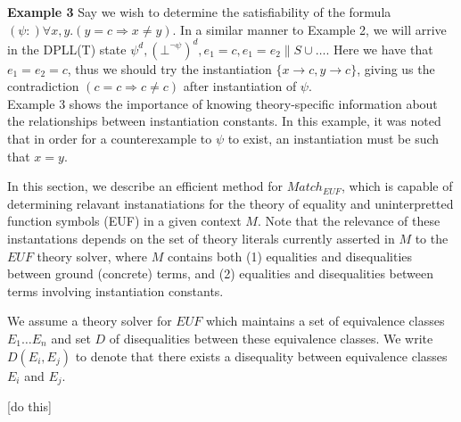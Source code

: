 \documentclass{llncs}
\begin{document}
{\bf Example 3} 
Say we wish to determine the satisfiability of the formula $(\psi :) \forall x, y. ( y = c \Rightarrow x \neq y )$.
In a similar manner to Example 2, we will arrive in the DPLL(T) state $\psi^d, (\bot^{ \neg \psi })^d, e_1 = c, e_1 = e_2 \parallel S \cup \ldots$.
Here we have that $e_1 = e_2 = c$, thus we should try the instantiation $\{ x \rightarrow c, y \rightarrow c \}$, giving us the contradiction $( c = c \Rightarrow c \neq c )$ after instantiation of $\psi$. \\

Example 3 shows the importance of knowing theory-specific information about the relationships between instantiation constants.  
In this example, it was noted that in order for a counterexample to $\psi$ to exist, an instantiation must be such that $x = y$.

In this section, we describe an efficient method for $Match_{EUF}$, which is capable of determining relavant instanatiations for the theory of equality and uninterpretted function symbols (EUF) in a given context $M$.
Note that the relevance of these instantations depends on the set of theory literals currently asserted in $M$ to the $EUF$ theory solver, where $M$ contains both (1) equalities and disequalities between ground (concrete) terms, and (2) equalities and disequalities between terms involving instantiation constants.

We assume a theory solver for $EUF$ which maintains a set of equivalence classes $E_1 \ldots E_n$ and set $D$ of disequalities between these equivalence classes.  
We write $D( E_i, E_j )$ to denote that there exists a disequality between equivalence classes $E_i$ and $E_j$.

[do this]


\end{document}
